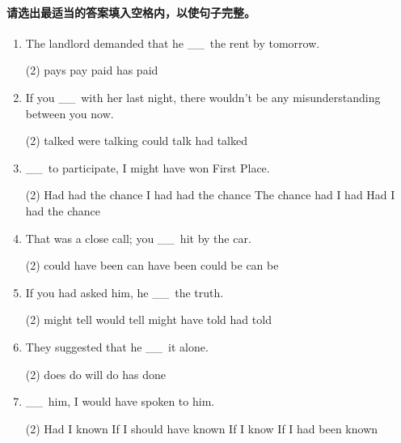 \documentclass{yufa}
\newcommand\ttu{ \_\_\ }
\begin{document}
\paragraph{请选出最适当的答案填入空格内，以使句子完整。}

\begin{enumerate}
\item The landlord demanded that he \ttu the rent by tomorrow.
  \begin{tasks}(2)
    \task pays
    \task pay
    \task paid
    \task has paid
  \end{tasks}

\item If you \ttu with her last night, there wouldn't be any misunderstanding between you now.
  \begin{tasks}(2)
    \task talked
    \task were talking
    \task could talk
    \task had talked
  \end{tasks}

\item \ttu to participate, I might have won First Place.
  \begin{tasks}(2)
    \task Had had the chance
    \task I had had the chance
    \task The chance had I had
    \task Had I had the chance
  \end{tasks}

\item That was a close call; you \ttu hit by the car.
  \begin{tasks}(2)
    \task could have been
    \task can have been
    \task could be
    \task can be
  \end{tasks}

\item If you had asked him, he \ttu the truth.
  \begin{tasks}(2)
    \task might tell
    \task would tell
    \task might have told
    \task had told
  \end{tasks}

\item They suggested that he \ttu it alone.
  \begin{tasks}(2)
    \task does
    \task do
    \task will do
    \task has done
  \end{tasks}

\item \ttu him, I would have spoken to him.
  \begin{tasks}(2)
    \task Had I known
    \task If I should have known
    \task If I know
    \task If I had been known
  \end{tasks}


\end{enumerate}
\end{document}
